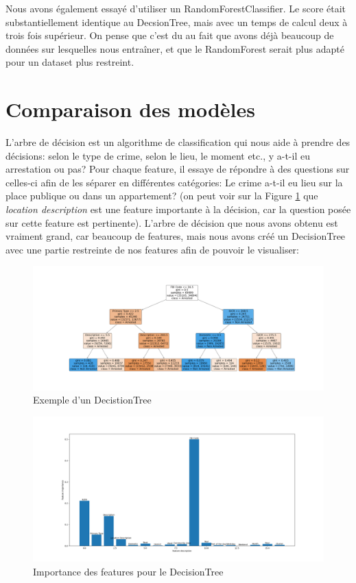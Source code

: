 \documentclass{article}
\begin{document}
    Nous avons également essayé d'utiliser un RandomForestClassifier. 
    Le score était substantiellement identique au DecsionTree, mais avec un 
    temps de calcul deux à trois fois supérieur. On pense que c'est du au
    fait que avons déjà beaucoup de données sur lesquelles nous entraîner, 
    et que le RandomForest serait plus adapté pour un dataset plus restreint.

    \section{Comparaison des modèles}

    L'arbre de décision est un algorithme de classification qui nous aide 
    à prendre des décisions:
    selon le type de crime, selon le lieu, le moment etc., y a-t-il eu 
    arrestation ou pas?  Pour chaque feature, il essaye de répondre à des  
    questions sur celles-ci afin de les séparer en différentes catégories:
    Le crime a-t-il eu lieu sur la place publique ou dans un appartement?
    (on peut voir sur la Figure \ref{D} que \textit{location description} est une feature
    importante à la décision, car la question posée sur cette feature est pertinente).
    L'arbre de décision que nous avons obtenu est vraiment grand, car beaucoup de
    features, mais nous avons créé un DecisionTree avec une partie restreinte de
    nos features afin de pouvoir le visualiser:

    \begin{figure}[H]
            \centering
	    \includegraphics[scale=.18]{images/treeExample.png}
	    \caption{Exemple d'un DecistionTree}
    \end{figure}
    \begin{figure}[H]
            \centering
	    \includegraphics[scale=.3]{images/feature_importance.png}
	    \caption{Importance des features pour le DecisionTree}
	    \label{D}
    \end{figure}
\end{document}
